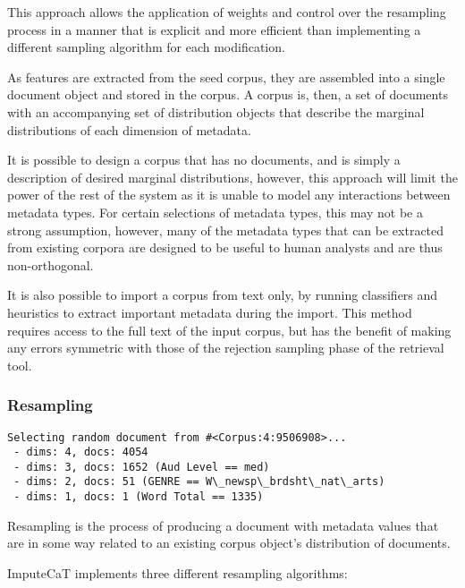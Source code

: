 This approach allows the application of weights and control over the resampling process in a manner that is explicit and more efficient than implementing a different sampling algorithm for each modification.

As features are extracted from the seed corpus, they are assembled into a single document object and stored in the corpus.  A corpus is, then, a set of documents with an accompanying set of distribution objects that describe the marginal distributions of each dimension of metadata.

It is possible to design a corpus that has no documents, and is simply a description of desired marginal distributions, however, this approach will limit the power of the rest of the system as it is unable to model any interactions between metadata types.  For certain selections of metadata types, this may not be a strong assumption, however, many of the metadata types that can be extracted from existing corpora are designed to be useful to human analysts and are thus non-orthogonal.

It is also possible to import a corpus from text only, by running classifiers and heuristics to extract important metadata during the import.  This method requires access to the full text of the input corpus, but has the benefit of making any errors symmetric with those of the rejection sampling phase of the retrieval tool.


\subsubsection{Resampling}

\begin{lstlisting}
Selecting random document from #<Corpus:4:9506908>...
 - dims: 4, docs: 4054
 - dims: 3, docs: 1652 (Aud Level == med)
 - dims: 2, docs: 51 (GENRE == W\_newsp\_brdsht\_nat\_arts)
 - dims: 1, docs: 1 (Word Total == 1335)
\end{lstlisting}

Resampling is the process of producing a document with metadata values that are in some way related to an existing corpus object's distribution of documents.

ImputeCaT implements three different resampling algorithms:

